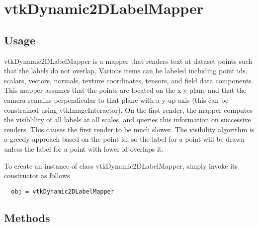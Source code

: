\section{vtkDynamic2DLabelMapper}

\subsection{Usage}

 vtkDynamic2DLabelMapper is a mapper that renders text at dataset
 points such that the labels do not overlap.
 Various items can be labeled including point ids, scalars,
 vectors, normals, texture coordinates, tensors, and field data components.
 This mapper assumes that the points are located on the x-y plane
 and that the camera remains perpendicular to that plane with a y-up
 axis (this can be constrained using vtkImageInteractor).
 On the first render, the mapper computes the visiblility of all labels
 at all scales, and queries this information on successive renders.
 This causes the first render to be much slower. The visibility algorithm
 is a greedy approach based on the point id, so the label for a point
 will be drawn unless the label for a point with lower id overlaps it.

To create an instance of class vtkDynamic2DLabelMapper, simply
invoke its constructor as follows
\begin{verbatim}
  obj = vtkDynamic2DLabelMapper
\end{verbatim}
\subsection{Methods}

